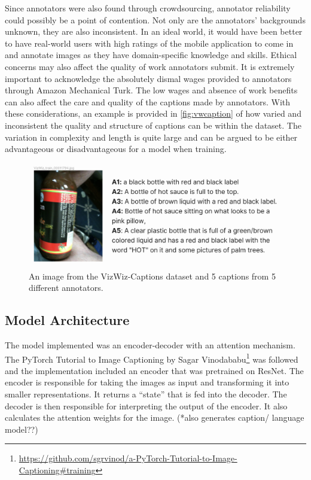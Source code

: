 \documentclass[11pt,a4paper]{article}
\begin{document}
Since annotators were also found through crowdsourcing, annotator reliability could possibly be a point of contention. Not only are the annotators’ backgrounds unknown, they are also inconsistent. In an ideal world, it would have been better to have real-world users with high ratings of the mobile application to come in and annotate images as they have domain-specific knowledge and skills. Ethical concerns may also affect the quality of work annotators submit. It is extremely important to acknowledge the absolutely dismal wages provided to annotators through Amazon Mechanical Turk.\citep{hara2018amazon} The low wages and absence of work benefits can also affect the care and quality of the captions made by annotators. With these considerations, an example is provided in \autoref{fig:vwcaption} of how varied and inconsistent the quality and structure of captions can be within the dataset. The variation in complexity and length is quite large and can be argued to be either advantageous or disadvantageous for a model when training. 

\begin{figure}[h]
  \includegraphics[width=\linewidth]{VizWiz_train_00011794_captioned.png}
  \caption{An image from the VizWiz-Captions dataset and 5 captions from 5 different annotators.}
  \label{fig:vwcaption}
\end{figure}

\subsection{Model Architecture}
The model implemented was an encoder-decoder with an attention mechanism. The PyTorch Tutorial to Image Captioning by Sagar Vinodababu\footnote{\url{https://github.com/sgrvinod/a-PyTorch-Tutorial-to-Image-Captioning#training}} was followed and the implementation included an encoder that was pretrained on ResNet. The encoder is responsible for taking the images as input and transforming it into smaller representations. It returns a “state” that is fed into the decoder. The decoder is then responsible for interpreting the output of the encoder. It also calculates the attention weights for the image. (*also generates caption/ language model??)
\end{document}
